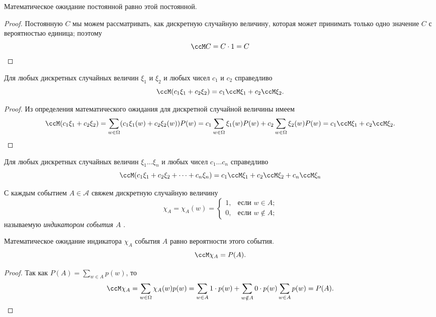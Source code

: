 \begin{thm}\label{thm1}
Математическое ожидание постоянной равно этой постоянной.
\end{thm}
\begin{proof}
Постоянную $C$ мы можем рассматривать, как дискретную случайную величину, которая может принимать только одно значение $C$ с вероятностью единица; поэтому
$$
\ccM C = C\cdot1=C
$$
\end{proof}
\begin{thm}[линейность] Для любых дискретных случайных величин $\xi_1$ и $\xi_2$ и любых чисел $c_1$ и $c_2$ справедливо
\begin{equation}
\ccM(c_1\xi_1+c_2\xi_2) = c_1\ccM\xi_1+c_2\ccM\xi_2.
\end{equation}
\end{thm}
\begin{proof}
Из определения математического ожидания для дискретной случайной величины имеем
$$
\ccM (c_1\xi_1+c_2\xi_2)=\sum\limits_{w\in\Omega}(c_1\xi_1(w)+c_2\xi_2(w))P(w) = c_1\sum\limits_{w\in\Omega}\xi_1(w) P(w)+c_2\sum\limits_{w\in\Omega}\xi_2(w) P(w)=c_1\ccM\xi_1+c_2\ccM\xi_2.
$$
\end{proof}

\begin{cons} Для любых дискретных случайных величин $\xi_1\dots\xi_n$ и любых чисел $c_1\dots c_n$ справедливо
$$
\ccM(c_1\xi_1+c_2\xi_2+\dots+c_n\xi_n) = c_1\ccM\xi_1+c_2\ccM\xi_2+c_n\ccM\xi_n
$$
\end{cons}


\begin{defn}
С каждым событием $A \in \mathcal{A}$ свяжем дискретную случайную величину
$$
\chi_A =\chi_A(w)=\begin{cases}
1,&\text{если $w \in A$;}\\
0,&\text{если $w \notin A$;}
\end{cases}
$$
называемую \textit{индикатором события $A$} .
\end{defn}

\begin{thm}
Математическое ожидание индикатора $\chi_A$ события $A$ равно вероятности этого события.
$$
\ccM\chi_A=P(A).
$$ 
\end{thm}
\begin{proof}
Так как $P(A)=\sum\limits_{w\in A}p(w)$, то 
$$
\ccM\chi_A=\sum\limits_{w\in\Omega}\chi_A(w)p(w)=\sum\limits_{w\in A}1\cdot p(w)+\sum\limits_{w\notin A}0\cdot p(w)\sum\limits_{w\in A}p(w)=P(A).
$$
\end{proof}


